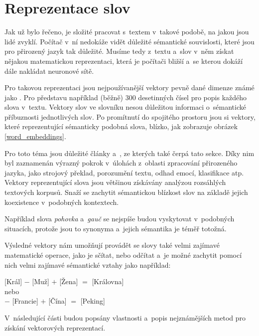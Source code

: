 \section{Reprezentace slov}
\label{reprezentace_slov}
Jak už bylo řečeno, je složité pracovat s~textem v~takové podobě, na jakou jsou lidé zvyklí. Počítač v~ní nedokáže vidět důležité sémantické souvislosti, které jsou pro přirozený jazyk tak důležité. Musíme tedy z~textu a~slov v~něm získat nějakou matematickou reprezentaci, která je počítači bližší a~se kterou dokáží dále nakládat neuronové sítě. \par
Pro takovou reprezentaci jsou nejpoužívanější vektory pevně dané dimenze známé jako . Pro představu například (běžně) 300 desetinných čísel pro popis každého slova v~textu. Vektory slov ve slovníku nesou důležitou informaci o~sémantické příbuznosti jednotlivých slov. Po promítnutí do spojitého prostoru jsou si vektory, které reprezentující sémanticky podobná slova, blízko, jak zobrazuje obrázek \ref{word_embeddings}.\par
Pro toto téma jsou důležité články \cite{mikolov2013embeddings} a~\cite{mikolov2013_2}, ze kterých také čerpá tato sekce. Díky nim byl zaznamenán výrazný pokrok v~úlohách z~oblasti zpracování přirozeného jazyka, jako strojový překlad, porozumění textu, odhad emocí, klasifikace atp.
Vektory reprezentující slova jsou většinou získávány analýzou rozsáhlých textových korpusů. Snaží se zachytit sémantickou blízkost slov na základě jejich koexistence v~podobných kontextech.\par 
Například slova \emph{pohovka} a~\emph{gauč} se nejspíše budou vyskytovat v~podobných situacích, protože jsou to synonyma a~jejich sémantika je téměř totožná.\par
Výsledné vektory nám umožňují provádět se slovy také velmi zajímavé matematické operace, jako je sčítat, nebo odčítat a~je možné zachytit pomocí nich velmi zajímavé sémantické vztahy jako například:
\begin{center}
[Král] $-$ [Muž] $+$ [Žena] $=$ [Královna]\\
\medskip
nebo\\
\medskip
[Paříž] $-$ [Francie] $+$ [Čína] $=$ [Peking]
\end{center}

V~následující části budou popsány vlastnosti a~popis nejznámějších metod pro získání vektorových reprezentací.

